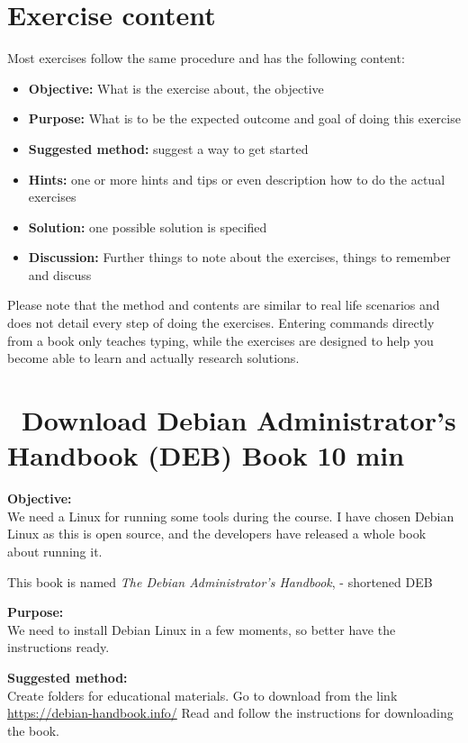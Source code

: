 \documentclass[a4paper,11pt,notitlepage]{report}
\begin{document}
\chapter*{\color{titlecolor}Exercise content}

Most exercises follow the same procedure and has the following content:
\begin{itemize}
\item {\bf Objective:} What is the exercise about, the objective
\item {\bf Purpose:} What is to be the expected outcome and goal of doing this exercise
\item {\bf Suggested method:} suggest a way to get started
\item {\bf Hints:} one or more hints and tips or even description how to
do the actual exercises
\item {\bf Solution:} one possible solution is specified
\item {\bf Discussion:} Further things to note about the exercises, things to remember and discuss
\end{itemize}

Please note that the method and contents are similar to real life scenarios and does not detail every step of doing the exercises. Entering commands directly from a book only teaches typing, while the exercises are designed to help you become able to learn and actually research solutions.


\chapter{\faExclamationTriangle\ Download Debian Administrator’s Handbook (DEB) Book 10 min}
\label{ex:sw-downloadDEB}



{\bf Objective:}\\
We need a Linux for running some tools during the course. I have chosen Debian Linux as this is open source, and the developers have released a whole book about running it.

This book is named
\emph{The Debian Administrator’s Handbook},  - shortened DEB

{\bf Purpose:}\\
We need to install Debian Linux in a few moments, so better have the instructions ready.

{\bf Suggested method:}\\
Create folders for educational materials. Go to download from the link \url{https://debian-handbook.info/}
Read and follow the instructions for downloading the book.
\end{document}
